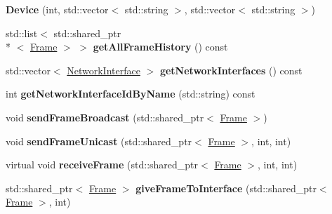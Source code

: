 \begin{DoxyCompactItemize}
\item 
\hypertarget{class_device_a7e58c6a90ef6e1cc99c32f4f83b90164}{{\bfseries Device} (int, std\-::vector$<$ std\-::string $>$, std\-::vector$<$ std\-::string $>$)}\label{class_device_a7e58c6a90ef6e1cc99c32f4f83b90164}

\item 
\hypertarget{class_device_a3b8577e07d6fe7a9f4d413a29aaccb7d}{std\-::list$<$ std\-::shared\-\_\-ptr\\*
$<$ \hyperlink{class_frame}{Frame} $>$ $>$ {\bfseries get\-All\-Frame\-History} () const }\label{class_device_a3b8577e07d6fe7a9f4d413a29aaccb7d}

\item 
\hypertarget{class_device_a2eef16f72e234f4f363958b20001b244}{std\-::vector$<$ \hyperlink{class_network_interface}{Network\-Interface} $>$ {\bfseries get\-Network\-Interfaces} () const }\label{class_device_a2eef16f72e234f4f363958b20001b244}

\item 
\hypertarget{class_device_aa27f9cd18637dce4e4ee439ddc5efca4}{int {\bfseries get\-Network\-Interface\-Id\-By\-Name} (std\-::string) const }\label{class_device_aa27f9cd18637dce4e4ee439ddc5efca4}

\item 
\hypertarget{class_device_a779c3ccbbc81a2cbf11e722d266beccf}{void {\bfseries send\-Frame\-Broadcast} (std\-::shared\-\_\-ptr$<$ \hyperlink{class_frame}{Frame} $>$)}\label{class_device_a779c3ccbbc81a2cbf11e722d266beccf}

\item 
\hypertarget{class_device_ad5e2696d45042135a34207cd6144eecc}{void {\bfseries send\-Frame\-Unicast} (std\-::shared\-\_\-ptr$<$ \hyperlink{class_frame}{Frame} $>$, int, int)}\label{class_device_ad5e2696d45042135a34207cd6144eecc}

\item 
\hypertarget{class_device_a03033f73d3e8ebffaab4fdc44eaec552}{virtual void {\bfseries receive\-Frame} (std\-::shared\-\_\-ptr$<$ \hyperlink{class_frame}{Frame} $>$, int, int)}\label{class_device_a03033f73d3e8ebffaab4fdc44eaec552}

\item 
\hypertarget{class_device_a0b3bbc84ba88d9689a69c4612fd6dddf}{std\-::shared\-\_\-ptr$<$ \hyperlink{class_frame}{Frame} $>$ {\bfseries give\-Frame\-To\-Interface} (std\-::shared\-\_\-ptr$<$ \hyperlink{class_frame}{Frame} $>$, int)}\label{class_device_a0b3bbc84ba88d9689a69c4612fd6dddf}


\end{DoxyCompactItemize}
